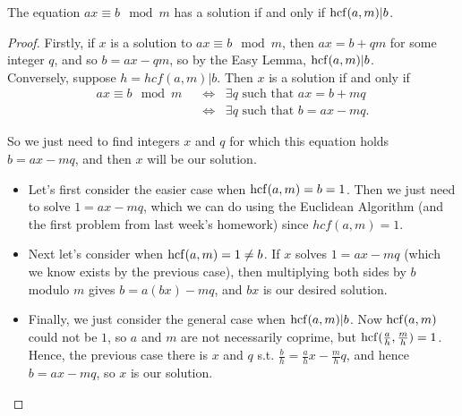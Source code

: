 \documentclass[11pt,dvipsnames]{book}
\def\hcf{{\rm hcf}}
\numberwithin{equation}{section} %
\numberwithin{figure}{section} %
\numberwithin{table}{section} %
\begin{document}
\begin{exercise}
\begin{theorem} The equation $ax\equiv b\mod m$ has a solution if and only if $\hcf(a,m)|b$. 
\end{theorem}


\begin{proof}

Firstly, if $x$ is a solution to $ax\equiv b\mod m$, then $ax=b+qm$ for some integer $q$, and so $b=ax-qm$, so by the Easy Lemma, $\hcf(a,m)|b$. \\

Conversely, suppose $h=hcf(a,m)|b$. Then $x$ is a solution if and only if
\begin{align*}
ax\equiv b \mod m & \;\; \Longleftrightarrow \;\;  \exists q \mbox{ such that } ax=b+mq\\
& \;\; \Longleftrightarrow  \;\;  \exists q \mbox{ such that } b=ax-mq.
\end{align*}

So we just need to find integers $x$ and $q$ for which this equation holds $ b=ax-mq$, and then $x$ will be our solution. 
\begin{itemize}
\item Let's first consider the easier case when {\color{red} $\hcf(a,m)=b=1$}. Then we just need to solve $1=ax-mq$, which we can do using the Euclidean Algorithm (and the first problem from last week's homework) since $hcf(a,m)=1$. 
\item Next let's consider when {\color{red} $\hcf(a,m)=1\neq b$}. If $x$ solves $1=ax-mq$ (which we know exists by the previous case), then multiplying both sides by $b$ modulo $m$ gives $b=a(bx)-mq$, and $bx$ is our desired solution. 
\item Finally, we just consider the general case when $\hcf(a,m)|b$.  Now  $\hcf(a,m)$ could not be $1$, so $a$ and $m$ are not necessarily coprime, but $\hcf(\frac{a}{h},\frac{m}{h})=1$. Hence, the previous case there is $x$ and $q$ s.t.  $\frac{b}{h}=\frac{a}{h}x- \frac{m}{h}q$, and hence $b=ax-mq$, so $x$ is our solution.

%
%




\end{itemize}
\end{proof}
\end{exercise}
\end{document}
